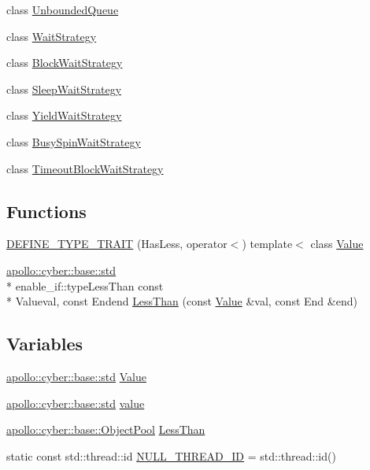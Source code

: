 \begin{DoxyCompactItemize}
class \hyperlink{classapollo_1_1cyber_1_1base_1_1UnboundedQueue}{Unbounded\-Queue}
\item 
class \hyperlink{classapollo_1_1cyber_1_1base_1_1WaitStrategy}{Wait\-Strategy}
\item 
class \hyperlink{classapollo_1_1cyber_1_1base_1_1BlockWaitStrategy}{Block\-Wait\-Strategy}
\item 
class \hyperlink{classapollo_1_1cyber_1_1base_1_1SleepWaitStrategy}{Sleep\-Wait\-Strategy}
\item 
class \hyperlink{classapollo_1_1cyber_1_1base_1_1YieldWaitStrategy}{Yield\-Wait\-Strategy}
\item 
class \hyperlink{classapollo_1_1cyber_1_1base_1_1BusySpinWaitStrategy}{Busy\-Spin\-Wait\-Strategy}
\item 
class \hyperlink{classapollo_1_1cyber_1_1base_1_1TimeoutBlockWaitStrategy}{Timeout\-Block\-Wait\-Strategy}
\end{DoxyCompactItemize}
\subsection*{Functions}
\begin{DoxyCompactItemize}
\item 
\hyperlink{namespaceapollo_1_1cyber_1_1base_ad57b78f03b12e4f7eb2bacacc393c99e}{D\-E\-F\-I\-N\-E\-\_\-\-T\-Y\-P\-E\-\_\-\-T\-R\-A\-I\-T} (Has\-Less, operator$<$) template$<$ class \hyperlink{namespaceapollo_1_1cyber_1_1base_a432d881d5e97cf8bbb7a30004a232dbf}{Value}
\item 
\hyperlink{classapollo_1_1cyber_1_1base_1_1std}{apollo\-::cyber\-::base\-::std} \\*
enable\-\_\-if\-::type\-Less\-Than const \\*
Valueval, const Endend \hyperlink{namespaceapollo_1_1cyber_1_1base_aae0a3d399beb069cc3994933bf5d1146}{Less\-Than} (const \hyperlink{namespaceapollo_1_1cyber_1_1base_a432d881d5e97cf8bbb7a30004a232dbf}{Value} \&val, const End \&end)
\end{DoxyCompactItemize}
\subsection*{Variables}
\begin{DoxyCompactItemize}
\item 
\hyperlink{classapollo_1_1cyber_1_1base_1_1std}{apollo\-::cyber\-::base\-::std} \hyperlink{namespaceapollo_1_1cyber_1_1base_a432d881d5e97cf8bbb7a30004a232dbf}{Value}
\item 
\hyperlink{classapollo_1_1cyber_1_1base_1_1std}{apollo\-::cyber\-::base\-::std} \hyperlink{namespaceapollo_1_1cyber_1_1base_aa3e2fff9b18a1214af4a70546fb7120f}{value}
\item 
\hyperlink{classapollo_1_1cyber_1_1base_1_1ObjectPool}{apollo\-::cyber\-::base\-::\-Object\-Pool} \hyperlink{namespaceapollo_1_1cyber_1_1base_ad32e38dcf7a608eb308aa87dea50371b}{Less\-Than}
\item 
static const std\-::thread\-::id \hyperlink{namespaceapollo_1_1cyber_1_1base_a3aa2d654ab213ffe2d37fd81e951094b}{N\-U\-L\-L\-\_\-\-T\-H\-R\-E\-A\-D\-\_\-\-I\-D} = std\-::thread\-::id()
\end{DoxyCompactItemize}


